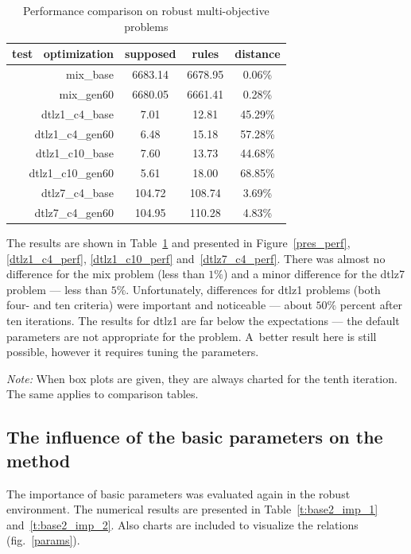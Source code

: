\begin{table}
  \centering
  \begin{tabular}{r c c c}
    \hline
    test \ optimization & supposed & rules & distance \\
    \hline
    \hline
    mix\_base & 6683.14 & 6678.95 & 0.06\% \\
    mix\_gen60 & 6680.05 & 6661.41 & 0.28\% \\
    dtlz1\_c4\_base & 7.01 & 12.81 & 45.29\% \\
    dtlz1\_c4\_gen60 & 6.48 & 15.18 & 57.28\% \\
    dtlz1\_c10\_base & 7.60 & 13.73 & 44.68\% \\
    dtlz1\_c10\_gen60 & 5.61 & 18.00 & 68.85\% \\
    dtlz7\_c4\_base & 104.72 & 108.74 & 3.69\% \\
    dtlz7\_c4\_gen60 & 104.95 & 110.28 & 4.83\% \\
    \hline
  \end{tabular}
  \caption{Performance comparison on robust multi-objective problems}
  \label{t:perf-comp}
\end{table}

The results are shown in Table~\ref{t:perf-comp} and presented in
Figure~\ref{pres_perf}, \ref{dtlz1_c4_perf}, \ref{dtlz1_c10_perf}
and~\ref{dtlz7_c4_perf}. There was almost no difference for the mix problem
(less than $1\%$) and a minor difference for the dtlz7 problem --- less than
$5\%$. Unfortunately, differences for dtlz1 problems (both four- and ten
criteria) were important and noticeable --- about $50\%$ percent after ten
iterations. The results for dtlz1 are far below the expectations --- the
default parameters are not appropriate for the problem. A~better result here
is still possible, however it requires tuning the parameters.

\textit{Note:} When box plots are given, they are always charted for the tenth
iteration. The same applies to comparison tables.

 \clearpage{}

\subsection{The influence of the basic parameters on the method}

The importance of basic parameters was evaluated again in the robust
environment. The numerical results are presented in Table~\ref{t:base2_imp_1}
and~\ref{t:base2_imp_2}. Also charts are included to visualize the relations
(fig.~\ref{params}).

